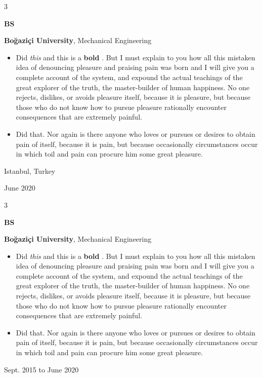 \documentclass[10pt, letterpaper]{article}
\newenvironment{highlights}{
    \begin{itemize}[
        topsep=0.10 cm,
        parsep=0.10 cm,
        partopsep=0pt,
        itemsep=0pt,
        leftmargin=0.4 cm + 10pt
    ]
}{
    \end{itemize}
} %
\newenvironment{threecolentry}[3][]{
    \onecolentry
    \def\thirdColumn{#3}
    \setcolumnwidth{1 cm, \fill, 4.5 cm}
    \begin{paracol}{3}
    {\raggedright #2} \switchcolumn
}{
    \switchcolumn \raggedleft \thirdColumn
    \end{paracol}
    \endonecolentry
} %
\let\hrefWithoutArrow\href
\renewcommand{\href}[2]{\hrefWithoutArrow{#1}{\mbox{\ifthenelse{\equal{#2}{}}{ }{#2 }\raisebox{.15ex}{\footnotesize \faExternalLink*}}}}
\begin{document}
        \begin{threecolentry}{\textbf{BS}}{
            Istanbul, Turkey

        June 2020
        }
            \textbf{Boğaziçi University}, Mechanical Engineering
            \begin{highlights}
                \item Did \textit{this} and this is a \textbf{bold} \href{https://example.com}{link}. But I must explain to you how all this mistaken idea of denouncing pleasure and praising pain was born and I will give you a complete account of the system, and expound the actual teachings of the great explorer of the truth, the master-builder of human happiness. No one rejects, dislikes, or avoids pleasure itself, because it is pleasure, but because those who do not know how to pursue pleasure rationally encounter consequences that are extremely painful.
                \item Did that. Nor again is there anyone who loves or pursues or desires to obtain pain of itself, because it is pain, but because occasionally circumstances occur in which toil and pain can procure him some great pleasure.
            \end{highlights}
        \end{threecolentry}

        \vspace{0.2 cm}

        \begin{threecolentry}{\textbf{BS}}{
            Sept. 2015 to June 2020
        }
            \textbf{Boğaziçi University}, Mechanical Engineering
            \begin{highlights}
                \item Did \textit{this} and this is a \textbf{bold} \href{https://example.com}{link}. But I must explain to you how all this mistaken idea of denouncing pleasure and praising pain was born and I will give you a complete account of the system, and expound the actual teachings of the great explorer of the truth, the master-builder of human happiness. No one rejects, dislikes, or avoids pleasure itself, because it is pleasure, but because those who do not know how to pursue pleasure rationally encounter consequences that are extremely painful.
                \item Did that. Nor again is there anyone who loves or pursues or desires to obtain pain of itself, because it is pain, but because occasionally circumstances occur in which toil and pain can procure him some great pleasure.
            \end{highlights}
        \end{threecolentry}
\end{document}
